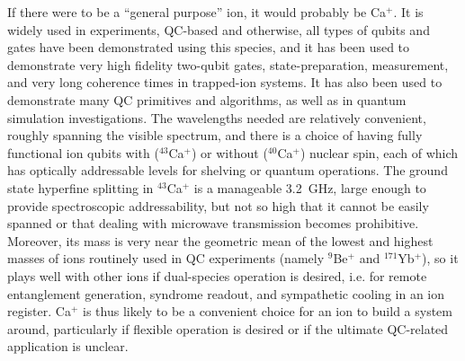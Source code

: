 \documentclass[%
12pt,
 amsmath,amssymb,
]{revtex4-2}
\begin{document}
If there were to be a ``general purpose'' ion, it would probably be Ca$^{+}$.  It is widely used in experiments, QC-based and otherwise, all types of qubits and gates have been demonstrated using this species, and it has been used to demonstrate very high fidelity two-qubit gates, state-preparation, measurement, and very long coherence times in trapped-ion systems.  It has also been used to demonstrate many QC primitives and algorithms, as well as in quantum simulation investigations.  The wavelengths needed are relatively convenient, roughly spanning the visible spectrum, and there is a choice of having fully functional ion qubits with ($^{43}$Ca$^{+}$) or without ($^{40}$Ca$^{+}$) nuclear spin, each of which has optically addressable levels for shelving or quantum operations.  The ground state hyperfine splitting in $^{43}$Ca$^{+}$ is a manageable 3.2~GHz, large enough to provide spectroscopic addressability, but not so high that it cannot be easily spanned or that dealing with microwave transmission becomes prohibitive.  Moreover, its mass is very near the geometric mean of the lowest and highest masses of ions routinely used in QC experiments (namely $^{9}$Be$^{+}$ and $^{171}$Yb$^{+}$), so it plays well with other ions if dual-species operation is desired, i.e. for remote entanglement generation, syndrome readout, and sympathetic cooling in an ion register. Ca$^{+}$ is thus likely to be a convenient choice for an ion to build a system around, particularly if flexible operation is desired or if the ultimate QC-related application is unclear.
\end{document}
